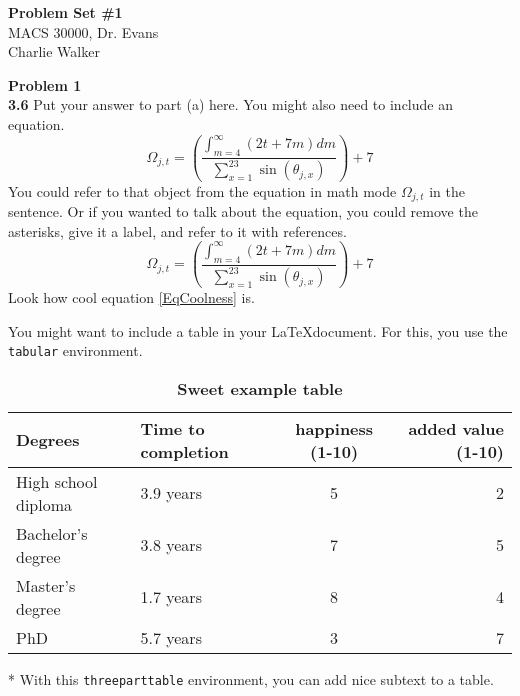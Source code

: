 \documentclass[letterpaper,12pt]{article}
\theoremstyle{definition}
\begin{document}
\begin{flushleft}
  \textbf{\large{Problem Set \#1}} \\
  MACS 30000, Dr. Evans \\
  Charlie Walker
\end{flushleft}

\vspace{5mm}

\noindent\textbf{Problem 1} \\

\noindent\textbf{3.6} Put your answer to part (a) here. You might also need to include an equation.
\begin{equation*}
  \Omega_{j,t} = \left(\frac{\int_{m=4}^\infty(2t + 7m)dm}{\sum_{x=1}^23\sin(\theta_{j,x})}\right) + 7
\end{equation*}
You could refer to that object from the equation in math mode $\Omega_{j,t}$ in the sentence. Or if you wanted to talk about the equation, you could remove the asterisks, give it a label, and refer to it with references.
\begin{equation}\label{EqCoolness}
  \Omega_{j,t} = \left(\frac{\int_{m=4}^\infty(2t + 7m)dm}{\sum_{x=1}^23\sin(\theta_{j,x})}\right) + 7
\end{equation}
Look how cool equation \eqref{EqCoolness} is.

You might want to include a table in your \LaTeX document. For this, you use the \texttt{tabular} environment.
\begin{table}[htbp] \centering \captionsetup{width=6.0in}
\caption{\label{TabExample}\textbf{Sweet example table}}
  \begin{threeparttable}
  \begin{tabular}{>{\small}l |>{\small}l >{\small}c |>{\small}r}
    \hline\hline
    Degrees & Time to completion & happiness (1-10) & added value (1-10) \\
    \hline
    High school diploma & 3.9 years & 5 & 2 \\
    Bachelor's degree   & 3.8 years & 7 & 5 \\
    Master's degree     & 1.7 years & 8 & 4 \\
    PhD                 & 5.7 years & 3 & 7 \\
    \hline\hline
  \end{tabular}
  \begin{tablenotes}
    \scriptsize{\item[*]With this \texttt{threeparttable} environment, you can add nice subtext to a table.}
  \end{tablenotes}
  \end{threeparttable}
\end{table}
\end{document}
